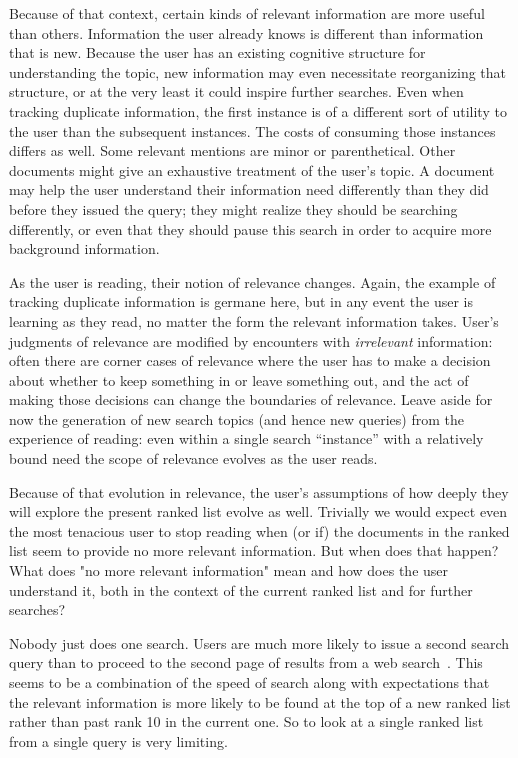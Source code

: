 \documentclass[nobib]{tufte-book}
\begin{document}
Because of that context, certain kinds of relevant information are more useful than others.  Information the user already knows is different than information that is new.  Because the user has an existing cognitive structure for understanding the topic, new information may even necessitate reorganizing that structure, or at the very least it could inspire further searches. Even when tracking duplicate information, the first instance is of a different sort of utility to the user than the subsequent instances.  The costs of consuming those instances differs as well.  Some relevant mentions are minor or parenthetical.  Other documents might give an exhaustive treatment of the user's topic.  A document may help the user understand their information need differently than they did before they issued the query; they might realize they should be searching differently, or even that they should pause this search in order to acquire more background information.

As the user is reading, their notion of relevance changes.  Again, the example of tracking duplicate information is germane here, but in any event the user is learning as they read, no matter the form the relevant information takes.  User's judgments of relevance are modified by encounters with {\em irrelevant} information: often there are corner cases of relevance where the user has to make a decision about whether to keep something in or leave something out, and the act of making those decisions can change the boundaries of relevance.  Leave aside for now the generation of new search topics (and hence new queries) from the experience of reading: even within a single search ``instance'' with a relatively bound need the scope of relevance evolves as the user reads.

Because of that evolution in relevance, the user's assumptions of how deeply they will explore the present ranked list evolve as well.  Trivially we would expect even the most tenacious user to stop reading when (or if) the documents in the ranked list seem to provide no more relevant information.  But when does that happen?  What does "no more relevant information" mean and how does the user understand it, both in the context of the current ranked list and for further searches?

Nobody just does one search.  Users are much more likely to issue a second search query than to proceed to the second page of results from a web search~\autocite{ref-missing}.  This seems to be a combination of the speed of search along with expectations that the  relevant information is more likely to be found at the top of a new ranked list rather than past rank 10 in the current one.  So to look at a single ranked list from a single query is very limiting.
\end{document}
